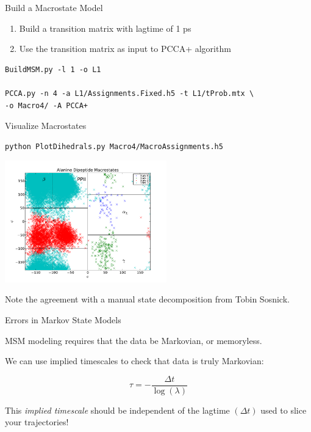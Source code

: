 \documentclass[10pt]{beamer}
\begin{document}
\begin{frame}[fragile]{Build a Macrostate Model}

\begin{enumerate}
 \item Build a transition matrix with lagtime of 1 ps
 \item Use the transition matrix as input to PCCA+ algorithm
\end{enumerate}

\vfill

 \begin{verbatim}
BuildMSM.py -l 1 -o L1

PCCA.py -n 4 -a L1/Assignments.Fixed.h5 -t L1/tProb.mtx \
-o Macro4/ -A PCCA+
 \end{verbatim}

 
\end{frame}


\begin{frame}[fragile]{Visualize Macrostates}
 
 \begin{verbatim}
python PlotDihedrals.py Macro4/MacroAssignments.h5
 \end{verbatim}

\includegraphics[width=7.0cm]{Figures/Macro4.pdf}

Note the agreement with a manual state decomposition from Tobin Sosnick.
 
\end{frame}

\begin{frame}{Errors in Markov State Models}
 
MSM modeling requires that the data be Markovian, or memoryless.

\vfill

We can use implied timescales to check that data is truly Markovian:


$$\tau = -\frac{\Delta t}{\log(\lambda)}$$


This \emph{implied timescale} should be independent of the lagtime $(\Delta t)$ used to slice your trajectories!
 
\end{frame}
\end{document}
